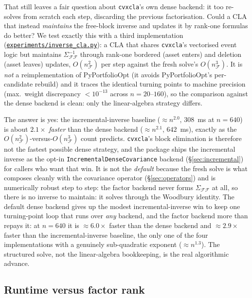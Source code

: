 \documentclass[11pt]{article}
\newcommand{\Sig}{\Sigma}
\newcommand{\F}{\mathcal{F}}        %
\newcommand{\inv}{^{-1}}
\newcommand{\repourl}{https://github.com/cvxgrp/cvxcla}
\newcommand{\srcref}{v1.8.1}
\newcommand{\srcfile}[2]{\href{\repourl/blob/\srcref/#1}{\texttt{#2}}}
\begin{document}
That still leaves a fair question about \texttt{cvxcla}'s own dense backend: it too
re-solves from scratch each step, discarding the previous factorisation. Could a
CLA that instead \emph{maintains} the free-block inverse and updates it by
rank-one formulas do better? We test exactly this with a third implementation
(\srcfile{experiments/inverse_cla.py}{experiments/inverse\_cla.py}): a CLA that shares \texttt{cvxcla}'s
vectorised event logic but maintains $\Sig_{\F\F}\inv$ through rank-one bordered
(asset enters) and deletion (asset leaves) updates, $O(n_\F^2)$ per step against
the fresh solve's $O(n_\F^3)$. It is \emph{not} a reimplementation of
PyPortfolioOpt (it avoids PyPortfolioOpt's per-candidate rebuild) and it
traces the identical turning points to machine precision (max.\ weight discrepancy
$<10^{-13}$ across $n=20$--$160$), so the comparison against the dense backend is
clean: only the linear-algebra strategy differs.

The answer is yes: the incremental-inverse baseline ($\approx n^{2.0}$, $308$~ms at
$n=640$) is about $2.1\times$ \emph{faster} than the dense backend
($\approx n^{2.1}$, $642$~ms), exactly as the $O(n_\F^2)$-versus-$O(n_\F^3)$ count
predicts. \texttt{cvxcla}'s block elimination is therefore not the fastest possible
dense strategy, and the package ships the incremental inverse as the opt-in
\texttt{IncrementalDenseCovariance} backend (\S\ref{sec:incremental}) for callers
who want that win. It is not the \emph{default} because the fresh solve is what
composes cleanly with the covariance operator (\S\ref{sec:operators}) and is
numerically robust step to step: the factor backend never forms $\Sig_{\F\F}$ at
all, so there is no inverse to maintain: it solves through the Woodbury
identity. The default dense backend gives up the modest incremental-inverse win to
keep one turning-point loop that runs over \emph{any} backend, and the factor
backend more than repays it: at $n=640$ it is $\approx 6.0\times$ faster than the
dense backend and $\approx 2.9\times$ faster than the incremental-inverse baseline,
the only one of the four implementations with a genuinely sub-quadratic exponent
($\approx n^{1.3}$). The structured solve, not the linear-algebra bookkeeping, is
the real algorithmic advance.

\subsection{Runtime versus factor rank}
\label{sec:rankscaling}
\end{document}
